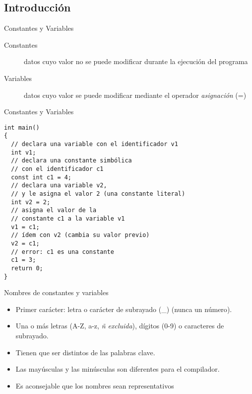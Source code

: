 \documentclass[xcolor={usenames,svgnames,dvipsnames}, aspectratio=169]{beamer}
\begin{document}
\subsection{Introducción}
\label{sec:org67ddb09}
\begin{frame}[label={sec:org194296a}]{Constantes y Variables}
\begin{description}
\item[{Constantes}] datos cuyo valor no se puede modificar durante la ejecución del programa
\item[{Variables}] datos cuyo valor se puede modificar mediante el operador \emph{asignación} (=)
\end{description}
\end{frame}
\begin{frame}[label={sec:org2be2e35},fragile,plain]{Constantes y Variables}
 \lstset{language=C,label= ,caption= ,captionpos=b,numbers=none}
\begin{lstlisting}
int main()
{
  // declara una variable con el identificador v1
  int v1;
  // declara una constante simbólica
  // con el identificador c1
  const int c1 = 4;
  // declara una variable v2,
  // y le asigna el valor 2 (una constante literal)
  int v2 = 2;
  // asigna el valor de la
  // constante c1 a la variable v1
  v1 = c1;
  // ídem con v2 (cambia su valor previo)
  v2 = c1;
  // error: c1 es una constante
  c1 = 3;
  return 0;
}
\end{lstlisting}
\end{frame}
\begin{frame}[label={sec:org1f9af04}]{Nombres de constantes y variables}
\begin{itemize}
\item Primer carácter: letra o carácter de subrayado (\_) (\alert{nunca un número}).
\item Una o más letras (A-Z, a-z, \emph{ñ excluida}), dígitos (0-9) o caracteres de subrayado.
\item Tienen que ser distintos de las palabras clave.
\item Las mayúsculas y las minúsculas son diferentes para el compilador.
\item Es aconsejable que los nombres sean representativos
\end{itemize}
\end{frame}
\end{document}
